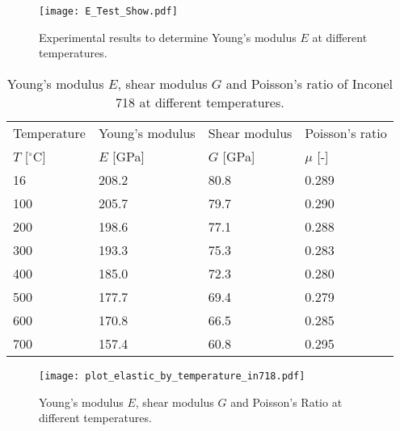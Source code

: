 \begin{figure}[!htp]
\centering
\texttt{[image: E\_Test\_Show.pdf]}
\caption{Experimental results to determine Young's modulus $E$ at different temperatures.}
\label{Fig:E_Test_Show}
\end{figure}

\begin{table}[htbp]
  \centering
  \caption{Young's modulus $E$, shear modulus $G$ and Poisson's ratio of Inconel 718 at different temperatures.}
    \begin{tabular}{p{3cm}p{3cm}p{3cm}p{3cm}}
    \toprule
    Temperature & Young's modulus & Shear modulus & Poisson's ratio \\
    $T$ [$^{\circ}$C] & $E$ [GPa] & $G$ [GPa] & $\mu$ [-] \\
    \midrule
    16    & 208.2  & 80.8  & 0.289 \\
    100   & 205.7  & 79.7  & 0.290 \\
    200   & 198.6  & 77.1  & 0.288 \\
    300   & 193.3  & 75.3  & 0.283 \\
    400   & 185.0  & 72.3  & 0.280 \\
    500   & 177.7  & 69.4  & 0.279 \\
    600   & 170.8  & 66.5  & 0.285 \\
    700   & 157.4  & 60.8  & 0.295 \\
    \bottomrule
    \end{tabular}%
  \label{Tab:EandG}%
\end{table}%

\begin{figure}[!htp]
\centering
\texttt{[image: plot\_elastic\_by\_temperature\_in718.pdf]}
\caption{Young's modulus $E$, shear modulus $G$ and Poisson's Ratio at different temperatures.}
\label{Fig:plot_elastic_by_temperature_in718}
\end{figure}

